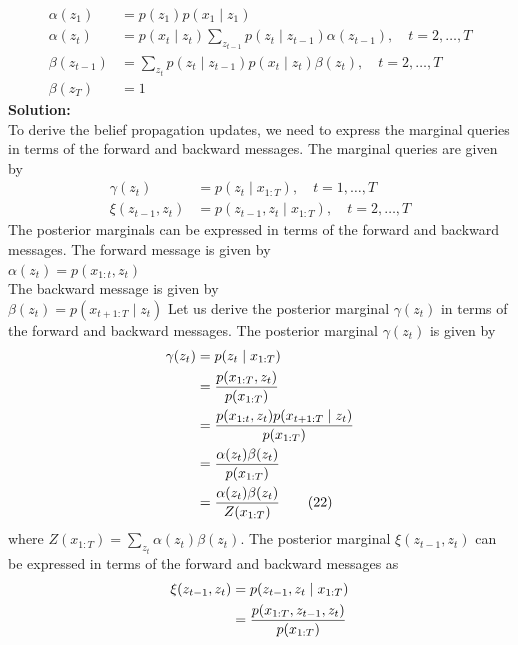 \documentclass[a3paper,12pt]{extarticle} %
\begin{document}
\begin{enumerate}
\begin{enumerate}
\begin{align}
        \alpha(z_1) &= p(z_1) p(x_1 \mid z_1) \tag{26} \\
        \alpha(z_t) &= p(x_t \mid z_t) \sum_{z_{t-1}} p(z_t \mid z_{t-1}) \alpha(z_{t-1}), \quad t = 2, \ldots, T \tag{27} \\
        \beta(z_{t-1}) &= \sum_{z_t} p(z_t \mid z_{t-1}) p(x_t \mid z_t) \beta(z_t), \quad t = 2, \ldots, T \tag{28} \\
        \beta(z_T) &= 1 \tag{29}
    \end{align}
    \textbf{Solution:}
    \\ To derive the belief propagation updates, we need to express the marginal queries in terms of the forward and backward messages. The marginal queries are given by
    \begin{align}
        \gamma(z_t) &= p(z_t \mid x_{1:T}), \quad t = 1, \ldots, T \tag{18} \\
        \xi(z_{t-1}, z_t) &= p(z_{t-1}, z_t \mid x_{1:T}), \quad t = 2, \ldots, T \tag{19}
    \end{align}
   The posterior marginals can be expressed in terms of the forward and backward messages. The forward message is given by
    \\ \(\alpha(z_t) = p(x_{1:t}, z_t)\)
    \\ The backward message is given by
    \\ \(\beta(z_t) = p(x_{t+1:T} \mid z_t)\)
    Let us derive the posterior marginal \(\gamma(z_t)\) in terms of the forward and backward messages. The posterior marginal \(\gamma(z_t)\) is given by
    \begin{align}
        \gamma(z_t) &= p(z_t \mid x_{1:T}) \notag \\
        &= \frac{p(x_{1:T}, z_t)}{p(x_{1:T})} \notag \\
        &= \frac{p(x_{1:t}, z_t) p(x_{t+1:T} \mid z_t
        )}{p(x_{1:T})} \notag \\
        &= \frac{\alpha(z_t) \beta(z_t)}{p(x_{1:T})} \notag \\
        &= \frac{\alpha(z_t) \beta(z_t)}{Z(x_{1:T})} \tag{22}
    \end{align}
    where \(Z(x_{1:T}) = \sum_{z_t} \alpha(z_t) \beta(z_t)\). The posterior marginal \(\xi(z_{t-1}, z_t)\) can be expressed in terms of the forward and backward messages as
    \begin{align}
        \xi(z_{t-1}, z_t) &= p(z_{t-1}, z_t \mid x_{1:T}) \notag \\
        &= \frac{p(x_{1:T}, z_{t-1}, z_t)}{p(x_{1:T})} \notag \\

\end{align}
\end{enumerate}
\end{enumerate}
\end{document}
